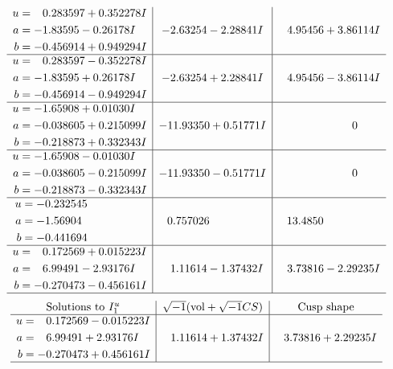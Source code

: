 \documentclass[1p]{elsarticle_modified}
\theoremstyle{definition}
\newcommand{\I}{\sqrt{-1}}
\begin{document}
$$\begin{array}{c|c|c}
\begin{aligned}
u &= \phantom{-}0.283597 + 0.352278 I \\
a &= -1.83595 - 0.26178 I \\
b &= -0.456914 + 0.949294 I\end{aligned}
 & -2.63254 - 2.28841 I & \phantom{-}4.95456 + 3.86114 I \\ \hline\begin{aligned}
u &= \phantom{-}0.283597 - 0.352278 I \\
a &= -1.83595 + 0.26178 I \\
b &= -0.456914 - 0.949294 I\end{aligned}
 & -2.63254 + 2.28841 I & \phantom{-}4.95456 - 3.86114 I \\ \hline\begin{aligned}
u &= -1.65908 + 0.01030 I \\
a &= -0.038605 + 0.215099 I \\
b &= -0.218873 + 0.332343 I\end{aligned}
 & -11.93350 + 0.51771 I & \phantom{-0.000000 } 0 \\ \hline\begin{aligned}
u &= -1.65908 - 0.01030 I \\
a &= -0.038605 - 0.215099 I \\
b &= -0.218873 - 0.332343 I\end{aligned}
 & -11.93350 - 0.51771 I & \phantom{-0.000000 } 0 \\ \hline\begin{aligned}
u &= -0.232545\phantom{ +0.000000I} \\
a &= -1.56904\phantom{ +0.000000I} \\
b &= -0.441694\phantom{ +0.000000I}\end{aligned}
 & \phantom{-}0.757026\phantom{ +0.000000I} & \phantom{-}13.4850\phantom{ +0.000000I} \\ \hline\begin{aligned}
u &= \phantom{-}0.172569 + 0.015223 I \\
a &= \phantom{-}6.99491 - 2.93176 I \\
b &= -0.270473 - 0.456161 I\end{aligned}
 & \phantom{-}1.11614 - 1.37432 I & \phantom{-}3.73816 - 2.29235 I\\
 \hline 
 \end{array}$$\newpage$$\begin{array}{c|c|c}  
\text{Solutions to }I^u_{1}& \I (\text{vol} + \sqrt{-1}CS) & \text{Cusp shape}\\
 \hline 
\begin{aligned}
u &= \phantom{-}0.172569 - 0.015223 I \\
a &= \phantom{-}6.99491 + 2.93176 I \\
b &= -0.270473 + 0.456161 I\end{aligned}
 & \phantom{-}1.11614 + 1.37432 I & \phantom{-}3.73816 + 2.29235 I\\
 \hline 
 \end{array}$$\newpage\newpage\renewcommand{\arraystretch}{1}
\end{document}

